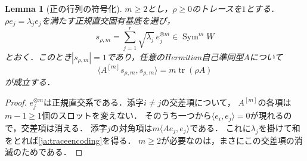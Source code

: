 \documentclass[12pt]{amsart}
\newtheorem{lem}[thm]{Lemma}
\theoremstyle{definition}
\theoremstyle{remark}
\numberwithin{equation}{section}
\DeclareMathOperator{\tr}{tr}
\DeclareMathOperator{\Sym}{Sym}
\theoremstyle{definition}
\begin{document}
\begin{lem}[正の行列の符号化]\label{ja:encoding}
$m\geq2$とし，$\rho\geq0$のトレースを$1$とする．
$\rho e_j=\lambda_j e_j$を満たす正規直交固有基底を選び，
\begin{equation}\label{ja:encodedvector}
 s_{\rho,m}=\sum_{j=1}^r\sqrt{\lambda_j}\,e_j^{\otimes m}
 \in\Sym^m W
\end{equation}
とおく．このとき$|s_{\rho,m}|=1$であり，任意のHermitian自己準同型$A$について
\begin{equation}\label{ja:traceencoding}
 \langle A^{[m]}s_{\rho,m},s_{\rho,m}\rangle
 =m\tr(\rho A)
\end{equation}
が成立する．
\end{lem}
\begin{proof}
$e_j^{\otimes m}$は正規直交系である．添字$i\ne j$の交差項について，
$A^{[m]}$の各項は$m-1\geq1$個のスロットを変えない．
そのうち一つから$\langle e_i,e_j\rangle=0$が現れるので，交差項は消える．
添字$j$の対角項は$m\langle Ae_j,e_j\rangle$である．
これに$\lambda_j$を掛けて和をとれば\eqref{ja:traceencoding}を得る．
$m\geq2$が必要なのは，まさにこの交差項の消滅のためである．
\end{proof}
\end{document}
